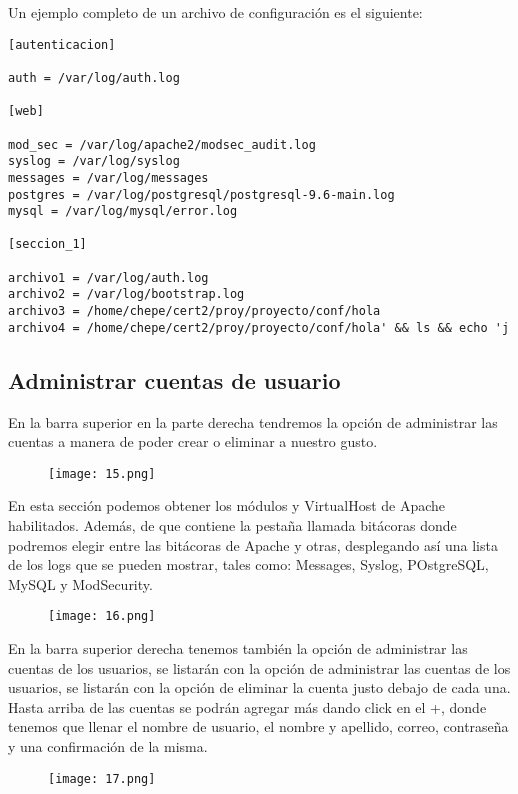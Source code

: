 \documentclass[12pt]{article}
\begin{document}
Un ejemplo completo de un archivo de configuración es el siguiente:
\begin{verbatim}
[autenticacion]

auth = /var/log/auth.log

[web]

mod_sec = /var/log/apache2/modsec_audit.log
syslog = /var/log/syslog
messages = /var/log/messages
postgres = /var/log/postgresql/postgresql-9.6-main.log
mysql = /var/log/mysql/error.log

[seccion_1]

archivo1 = /var/log/auth.log
archivo2 = /var/log/bootstrap.log
archivo3 = /home/chepe/cert2/proy/proyecto/conf/hola
archivo4 = /home/chepe/cert2/proy/proyecto/conf/hola' && ls && echo 'j

\end{verbatim}

\subsection{Administrar cuentas de usuario}
En la barra superior en la parte derecha tendremos la opción de administrar las cuentas a manera de poder crear o eliminar a nuestro gusto.


\begin{figure}[H]
  \centering
  \texttt{[image: 15.png]}
\end{figure}
En esta sección podemos obtener los módulos y VirtualHost de Apache habilitados.
Además, de que contiene la pestaña llamada bitácoras donde podremos elegir entre las bitácoras de Apache y otras,
desplegando así una lista de los logs que se pueden mostrar, tales como: Messages, Syslog, POstgreSQL, MySQL y ModSecurity.

\begin{figure}[H]
  \centering
  \texttt{[image: 16.png]}
\end{figure}
En la barra superior derecha tenemos también la opción de administrar las cuentas de los usuarios, se listarán con la opción de administrar las cuentas de los usuarios, se listarán con la opción de eliminar la cuenta justo debajo de cada una.\\
Hasta arriba de las cuentas se podrán agregar más dando click en el +, donde tenemos que llenar el nombre de usuario, el nombre y apellido, correo, contraseña y una confirmación de la misma.\\

\begin{figure}[H]
  \centering
  \texttt{[image: 17.png]}
\end{figure}
\end{document}
